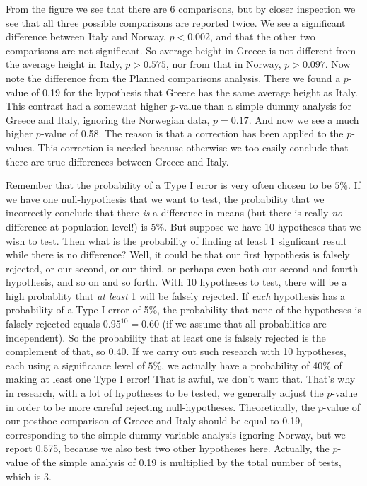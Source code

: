 \documentclass[]{report}\usepackage[]{graphicx}\usepackage[]{color}
\begin{document}
From the figure we see that there are 6 comparisons, but by closer inspection we see that all three possible comparisons are reported twice. We see a significant difference between Italy and Norway, $p<0.002$, and that the other two comparisons are not significant. So average height in Greece is not different from the average height in Italy, $p>0.575$, nor from that in Norway, $p>0.097$.
Now note the difference from the Planned comparisons analysis. There we found a $p$-value of 0.19 for the hypothesis that Greece has the same average height as Italy. This contrast had a somewhat higher $p$-value than a simple dummy analysis for Greece and Italy, ignoring the Norwegian data, $p=0.17$. And now we see a much higher $p$-value of 0.58. The reason is that a correction has been applied to the $p$-values. This correction is needed because otherwise we too easily conclude that there are true differences between Greece and Italy.

Remember that the probability of a Type I error is very often chosen to be $5\%$. If we have one null-hypothesis that we want to test, the probability that we incorrectly conclude that there \textit{is} a difference in means (but there is really \textit{no} difference at population level!) is $5\%$. But suppose we have 10 hypotheses that we wish to test. Then what is the probability of finding at least 1 signficant result while there is no difference? Well, it could be that our first hypothesis is falsely rejected, or our second, or our third, or perhaps even both our second and fourth hypothesis, and so on and so forth. With 10 hypotheses to test, there will be a high probablity that \textit{at least} 1 will be falsely rejected. If \textit{each} hypothesis has a probability of a Type I error of 5\%, the probability that none of the hypotheses is falsely rejected equals $0.95^10=0.60$ (if we assume that all probablities are independent). So the probability that at least one is falsely rejected is the complement of that, so 0.40. If we carry out such research with 10 hypotheses, each using a significance level of $5\%$, we actually have a probability of 40\% of making at least one Type I error! That is awful, we don't want that. That's why in research, with a lot of hypotheses to be tested, we generally adjust the $p$-value in order to be more careful rejecting null-hypotheses. Theoretically, the $p$-value of our posthoc comparison of Greece and Italy should be equal to 0.19, corresponding to the simple dummy variable analysis ignoring Norway, but we report 0.575, because we also test two other hypotheses here. Actually, the $p$-value of the simple analysis of 0.19 is multiplied by the total number of tests, which is 3.
\end{document}
